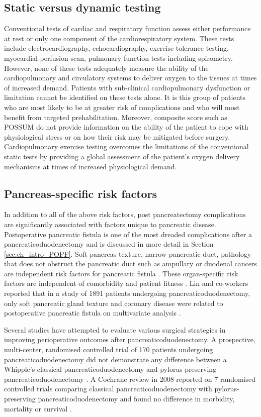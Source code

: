 \subsection{Static versus dynamic testing}

Conventional tests of cardiac and respiratory function assess either performance at rest or only one component of the cardiorespiratory system. 
These tests include electrocardiography, echocardiography, exercise tolerance testing, myocardial perfusion scan, pulmonary function tests including spirometry. 
However, none of these tests adequately measure the ability of the cardiopulmonary and circulatory systems to deliver oxygen to the tissues at times of increased demand. 
Patients with sub-clinical cardiopulmonary dysfunction or limitation cannot be identified on these tests alone. 
It is this group of patients who are most likely to be at greater risk of complications and who will most benefit from targeted prehabilitation. 
Moreover, composite score such as POSSUM do not provide information on the ability of the patient to cope with physiological stress or on how their risk may be mitigated before surgery.
Cardiopulmonary exercise testing overcomes the limitations of the conventional static tests by providing a global assessment of the patient's oxygen delivery mechanisms at times of increased physiological demand.

\subsection{Pancreas-specific risk factors}
In addition to all of the above risk factors, post pancreatectomy complications are significantly associated with factors unique to pancreatic disease.
Postoperative pancreatic fistula is one of the most dreaded complications after a pancreaticoduodenectomy and is discussed in more detail in Section \ref{sec:ch_intro_POPF}.
Soft pancreas texture, narrow pancreatic duct, pathology that does not obstruct the pancreatic duct such as ampullary or duodenal cancers are independent risk factors for pancreatic fistula \parencite{pratt_risk_2008}.
These organ-specific risk factors are independent of comorbidity and patient fitness \parencite{deoliveira_assessment_2006}.
Lin and co-workers reported that in a study of 1891 patients undergoing pancreaticoduodenectomy, only soft pancreatic gland texture and coronary disease were related to postoperative pancreatic fistula on multivariate analysis \parencite{lin_risk_2004}.

Several studies have attempted to evaluate various surgical strategies in improving perioperative outcomes after pancreaticoduodenectomy. 
A prospective, multi-center, randomised controlled trial of 170 patients undergoing pancreaticoduodenectomy did not demonstrate any difference between a Whipple's classical pancreaticoduodenectomy  and pylorus preserving pancreaticoduodenectomy \parencite{tran_pylorus_2004}. 
A Cochrane review in 2008 reported on 7 randomised controlled trials comparing classical pancreaticoduodenectomy with pylorus-preserving pancreaticoduodenectomy  and found no difference in morbidity, mortality or survival \parencite{diener_pancreaticoduodenectomy_2008}. 

